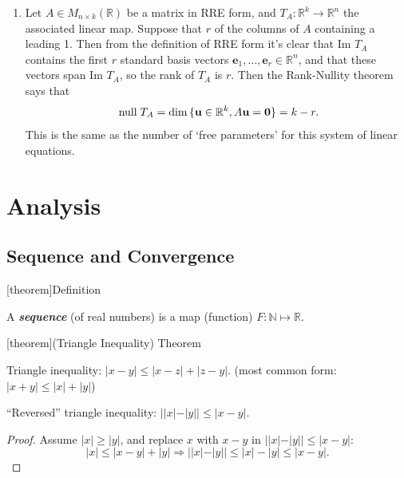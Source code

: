 \documentclass[12pt]{report}
\theoremstyle{definition}
\begin{document}
\begin{ex}
\begin{enumerate}[label = (\alph*)]
        \item Let $A \in M_{n\times k}(\mathbb{R})$ be a matrix in RRE form, and
            $T_A:\mathbb{R}^{k} \rightarrow{} \mathbb{R}^{n}$ the associated linear map.
            Suppose that $r$ of the columns of $A$ containing a leading 1.
            Then from the definition of RRE form it's clear that Im $T_A$ contains
            the first $r$ standard basis vectors $\mathbf{e}_1, \ldots, \mathbf{e}_r \in \mathbb{R}^{n}$,
            and that these vectors span Im $T_A$, so the rank of $T_A$ is $r$.
            Then the Rank-Nullity theorem says that\[
                \;\textnormal{null}\;T_A = \dim{\{\mathbf{u}\in \mathbb{R}^{k}, A\mathbf{u} = \mathbf{0}\}} = k - r.
            \]This is the same as the number of `free parameters' for this system of linear equations.
    \end{enumerate}
    
\end{ex}







\chapter{Analysis}

\section{Sequence and Convergence}

[theorem]{Definition}
\begin{sequence}
    A \textbf{\emph{sequence}} (of real numbers) is a map (function) $F: \mathbb{N} \mapsto \mathbb{R}$.
\end{sequence}

[theorem]{(Triangle Inequality) Theorem}
\begin{triangle inequality}
    Triangle inequality: $|x-y| \le |x-z| + |z-y|$. (most common form: $|x+y| \le |x| + |y|$)

    ``Reversed'' triangle inequality: $||x|-|y|| \le |x-y|$.
\end{triangle inequality}

\begin{proof}
    Assume $|x| \ge |y|$, and replace $x$ with $x - y$ in $||x|-|y|| \le |x-y|$:\[
        |x| \le |x-y|+|y| \Rightarrow{}||x|-|y|| \le |x|-|y| \le |x-y|.
    \]
\end{proof}
\end{document}
